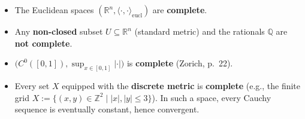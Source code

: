 \begin{example}
\begin{itemize}
  \item The Euclidean spaces $(\mathbb{R}^n, \langle\cdot,\cdot\rangle_{\text{eucl}})$ are
    \textbf{complete}.
  \item Any \textbf{non-closed} subset $U \subseteq \mathbb{R}^n$ (standard metric) and the
    rationals $\mathbb{Q}$ are \textbf{not complete}.
  \item $\big(C^0([0,1]), \sup_{x \in [0,1]}|\cdot|\big)$ is \textbf{complete} (Zorich, p.\ 22).
  \item Every set $X$ equipped with the \textbf{discrete metric} is \textbf{complete} (e.g., the finite grid $X := \{(x,y) \in \mathbb{Z}^2 \mid \lvert x\rvert, \lvert y\rvert \leq 3\}$). In such a space, every Cauchy sequence is eventually constant, hence convergent.
\end{itemize}
\end{example}


